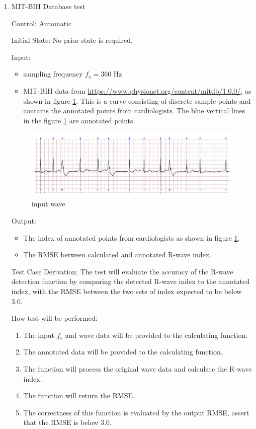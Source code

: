 \documentclass[12pt, titlepage]{article}
\begin{document}
\begin{enumerate}

  \item{MIT-BIH Database test\\}
  
  Control: Automatic
            
  Initial State: No prior state is required.
            
  Input:
  \begin{itemize}
    \item sampling frequency $f_s=360$ Hz
    \item MIT-BIH data from
    \url{https://www.physionet.org/content/mitdb/1.0.0/}, as shown in figure
    \ref{Fig_wave}. This is a curve consisting of discrete sample points and
    contains the annotated points from cardiologists.  The blue vertical lines
    in the figure \ref{Fig_wave} are annotated points.
  \end{itemize}

  \begin{figure}[h!]
    \begin{center}
      \includegraphics[width=1.1\textwidth]{wave}
      \caption{input wave}
      \label{Fig_wave} 
    \end{center}
  \end{figure}
  
  Output:
  \begin{itemize}
    \item The index of annotated points from cardiologists as shown in figure
    \ref{Fig_wave}.
    \item The RMSE between calculated and annotated R-wave index.
  \end{itemize}
  
  Test Case Derivation: The test will evaluate the accuracy of the R-wave
  detection function by comparing the detected R-wave index to the annotated
  index, with the RMSE between the two sets of index expected to be below $3.0$.
            
  How test will be performed: 
  \begin{enumerate}
    \item The input $f_s$ and wave data will be provided to the calculating
    function.
    \item The annotated data will be provided to the calculating function.
    \item The function will process the original wave data and calculate the
    R-wave index.
    \item The function will return the RMSE.
    \item The correctness of this function is evaluated by the output RMSE,
    assert that the RMSE is below $3.0$.
  \end{enumerate}


\end{enumerate}
\end{document}
